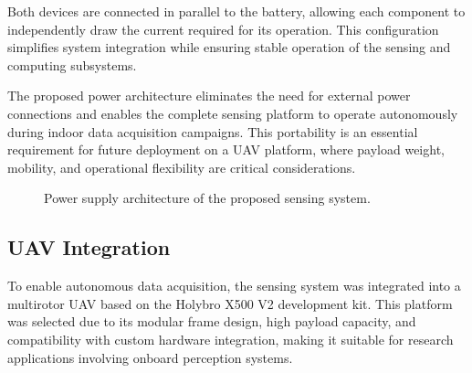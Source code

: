 Both devices are connected in parallel to the battery, allowing each component to independently draw the current required for its operation. This configuration simplifies system integration while ensuring stable operation of the sensing and computing subsystems.

The proposed power architecture eliminates the need for external power connections and enables the complete sensing platform to operate autonomously during indoor data acquisition campaigns. This portability is an essential requirement for future deployment on a UAV platform, where payload weight, mobility, and operational flexibility are critical considerations.



\begin{figure}[htbp]
\centering
{}
\caption{Power supply architecture of the proposed sensing system.}
\label{fig:power_architecture}
\end{figure}

\subsection{UAV Integration}
\label{subsec:uav_integration}

To enable autonomous data acquisition, the sensing system was integrated into a multirotor UAV based on the Holybro X500 V2 \cite {HolybroX500V2} development kit. This platform was selected due to its modular frame design, high payload capacity, and compatibility with custom hardware integration, making it suitable for research applications involving onboard perception systems.

